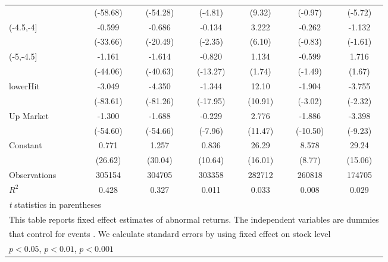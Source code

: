 {\begin{tabular}{l*{6}{c}}
                    &    (-58.68)         &    (-54.28)         &     (-4.81)         &      (9.32)         &     (-0.97)         &     (-5.72)         \\
[1em]
(-4.5,-4]           &      -0.599\sym{***}&      -0.686\sym{***}&      -0.134\sym{*}  &       3.222\sym{***}&      -0.262         &      -1.132         \\
                    &    (-33.66)         &    (-20.49)         &     (-2.35)         &      (6.10)         &     (-0.83)         &     (-1.61)         \\
[1em]
(-5,-4.5]           &      -1.161\sym{***}&      -1.614\sym{***}&      -0.820\sym{***}&       1.134         &      -0.599         &       1.716         \\
                    &    (-44.06)         &    (-40.63)         &    (-13.27)         &      (1.74)         &     (-1.49)         &      (1.67)         \\
[1em]
lowerHit            &      -3.049\sym{***}&      -4.350\sym{***}&      -1.344\sym{***}&       12.10\sym{***}&      -1.904\sym{**} &      -3.755\sym{*}  \\
                    &    (-83.61)         &    (-81.26)         &    (-17.95)         &     (10.91)         &     (-3.02)         &     (-2.32)         \\
[1em]
Up Market           &      -1.300\sym{***}&      -1.688\sym{***}&      -0.229\sym{***}&       2.776\sym{***}&      -1.886\sym{***}&      -3.398\sym{***}\\
                    &    (-54.60)         &    (-54.66)         &     (-7.96)         &     (11.47)         &    (-10.50)         &     (-9.23)         \\
[1em]
Constant            &       0.771\sym{***}&       1.257\sym{***}&       0.836\sym{***}&       26.29\sym{***}&       8.578\sym{***}&       29.24\sym{***}\\
                    &     (26.62)         &     (30.04)         &     (10.64)         &     (16.01)         &      (8.77)         &     (15.06)         \\
\hline
Observations        &      305154         &      304705         &      303358         &      282712         &      260818         &      174705         \\
\(R^{2}\)           &       0.428         &       0.327         &       0.011         &       0.033         &       0.008         &       0.029         \\
\hline\hline
\multicolumn{7}{l}{\footnotesize \textit{t} statistics in parentheses}\\
\multicolumn{7}{l}{\footnotesize This table reports fixed effect estimates of abnormal returns. The independent variables are dummies }\\
\multicolumn{7}{l}{\footnotesize  that control for events . We calculate standard errors by using fixed effect on stock level}\\
\multicolumn{7}{l}{\footnotesize \sym{*} \(p<0.05\), \sym{**} \(p<0.01\), \sym{***} \(p<0.001\)}\\
\end{tabular}
}
